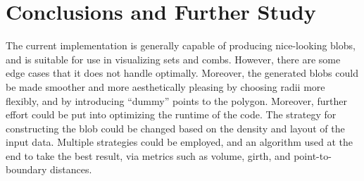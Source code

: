 \documentclass[paper=a4, fontsize=11pt]{scrartcl} %
\numberwithin{equation}{section} %
\numberwithin{figure}{section} %
\numberwithin{table}{section} %
\begin{document}
\section*{Conclusions and Further Study}
The current implementation is generally capable of producing nice-looking blobs,
and is suitable for use in visualizing sets and combs. However, there are some
edge cases that it does not handle optimally. Moreover, the generated blobs
could be made smoother and more aesthetically pleasing by choosing radii more
flexibly, and by introducing ``dummy'' points to the polygon. Moreover, further
effort could be put into optimizing the runtime of the code. The strategy for
constructing the blob could be changed based on the density and layout of the
input data. Multiple strategies could be employed, and an algorithm used at the
end to take the best result, via metrics such as volume, girth, and
point-to-boundary distances.

\end{document}
